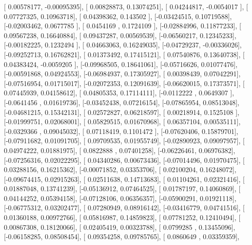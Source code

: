 \documentclass{article}
\begin{document}
       [ 0.00578177, -0.00095395],
       [ 0.00828873,  0.13074251],
       [ 0.04244817, -0.0054017 ],
       [ 0.07727325,  0.10963718],
       [ 0.04398362,  0.143502  ],
       [-0.03424515,  0.10719588],
       [-0.02003462,  0.0677785 ],
       [ 0.0454169 ,  0.1724109 ],
       [-0.02884996,  0.11877233],
       [ 0.09567238,  0.16640884],
       [ 0.09437287,  0.00569539],
       [-0.06560217,  0.12345233],
       [-0.00182225,  0.1232494 ],
       [ 0.04663063,  0.16249035],
       [-0.04729237, -0.00336026],
       [-0.09252713,  0.16762821],
       [ 0.01373492,  0.17415121],
       [ 0.07540876,  0.13640738],
       [ 0.04383424, -0.0059205 ],
       [-0.09968505,  0.18641061],
       [-0.05716626,  0.01077476],
       [-0.00591868,  0.04924553],
       [-0.06984937,  0.17305927],
       [ 0.00398439,  0.07042291],
       [-0.07516954,  0.01715017],
       [-0.02072353,  0.12091639],
       [-0.06620015,  0.17373571],
       [ 0.07445939,  0.04158612],
       [ 0.04805353,  0.17114111],
       [-0.0112222 ,  0.0649307 ],
       [-0.0641456 ,  0.01619736],
       [-0.03452438,  0.07216154],
       [-0.07865954,  0.08513048],
       [-0.04681215,  0.15342131],
       [ 0.02572827,  0.06218597],
       [ 0.00218914,  0.1525108 ],
       [-0.01999751,  0.02068001],
       [ 0.05829515,  0.01670968],
       [ 0.06357104,  0.00535111],
       [-0.0329366 ,  0.09045032],
       [ 0.07118419,  0.1101472 ],
       [-0.07620406,  0.15879701],
       [-0.07911682,  0.01091705],
       [ 0.09709535,  0.01955749],
       [-0.02890923,  0.09097957],
       [ 0.04974222,  0.01881975],
       [ 0.0822888 ,  0.07401258],
       [-0.06226461,  0.06976382],
       [-0.07256316,  0.02022295],
       [ 0.04340286,  0.00673436],
       [-0.07014496,  0.01970475],
       [ 0.03288156,  0.16215362],
       [-0.00071852,  0.03353706],
       [ 0.02100204,  0.16248072],
       [-0.09674415,  0.02915263],
       [ 0.02511638,  0.14713683],
       [ 0.01104261,  0.02321416],
       [ 0.01887048,  0.13741239],
       [-0.05136912,  0.07464525],
       [ 0.01787197,  0.14060869],
       [ 0.04144252,  0.05394158],
       [-0.07128106,  0.06356357],
       [-0.05900291,  0.01921118],
       [-0.06775312,  0.03202477],
       [ 0.07280949,  0.08916142],
       [-0.03416779,  0.04741516],
       [ 0.01360188,  0.00972766],
       [ 0.05816987,  0.14859823],
       [ 0.07781252,  0.12410494],
       [ 0.00867308,  0.18120066],
       [ 0.02405419,  0.00323788],
       [ 0.0799285 ,  0.13455096],
       [-0.06158285,  0.08508454],
       [ 0.09354258,  0.09785765],
       [ 0.0860649 ,  0.03359359],
\end{document}
